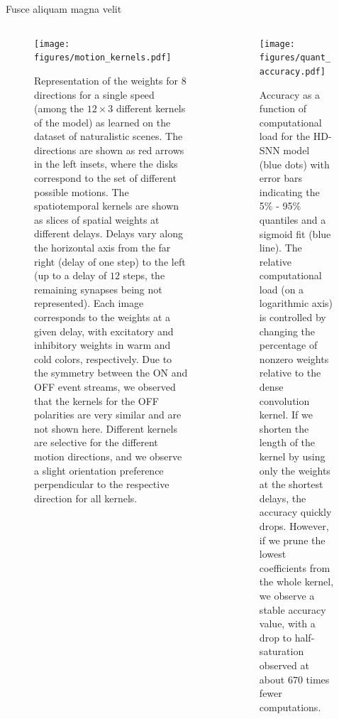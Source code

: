 \documentclass[final]{beamer}
\newlength{\colwidth}
\begin{document}
\begin{frame}[t]
\begin{columns}[t]
\begin{column}{\colwidth}
\begin{block}{Fusce aliquam magna velit}
\begin{columns}[t]
\begin{column}{\colwidth}
\begin{figure}
    {\centering
    \texttt{[image: figures/motion\_kernels.pdf]}
    }
    \caption{
    	Representation of the weights for $8$ directions for a single speed (among the $12 \times 3$ different kernels of the model) as learned on the dataset of naturalistic scenes. The directions are shown as red arrows in the left insets, where the disks correspond to the set of different possible motions. The spatiotemporal kernels are shown as slices of spatial weights at different delays. Delays vary along the horizontal axis from the far right (delay of one step) to the left (up to a delay of $12$ steps, the remaining synapses being not represented). Each image corresponds to the weights at a given delay, with excitatory and inhibitory weights in warm and cold colors, respectively. Due to the symmetry between the ON and OFF event streams, we observed that the kernels for the OFF polarities are very similar and are not shown here.	Different kernels are selective for the different motion directions, and we observe a slight orientation preference perpendicular to the respective direction for all kernels.
	}
    \label{fig:kernels}
\end{figure} 
\end{column}
%
\begin{column}{\colwidth}
\begin{figure}%
    \centering
    \texttt{[image: figures/quant\_accuracy.pdf]}
    \caption{
        Accuracy as a function of computational load for the HD-SNN model (blue dots) with error bars indicating the 5\% - 95\% quantiles and a sigmoid fit (blue line). The relative computational load (on a logarithmic axis) is controlled by changing the percentage of nonzero weights relative to the dense convolution kernel. If we shorten the length of the kernel by using only the weights at the shortest delays, the accuracy quickly drops. However, if we prune the lowest coefficients from the whole kernel, we observe a stable accuracy value, with a drop to half-saturation observed at about $670$ times fewer computations.
        }
    \label{fig:accuracy}
\end{figure}
\end{column}
\end{columns}

  \end{block}


\end{column}
\end{columns}
\end{frame}
\end{document}
